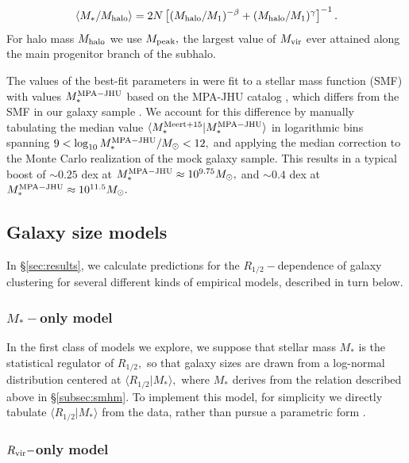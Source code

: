 \documentclass[usenatbib,usegraphicx,letterpaper]{mn2e}
\newcommand{\rhalf}{R_{1/2}}
\newcommand{\mstar}{M_{\ast}}
\newcommand{\mvir}{M_{\rm vir}}
\newcommand{\mpeak}{M_{\rm peak}}
\newcommand{\mhalo}{M_{\rm halo}}
\newcommand{\rvir}{R_{\rm vir}}
\newcommand{\msun}{M_\odot}
\begin{document}
\begin{equation}
\label{eq:smhm}
\langle\mstar/\mhalo\rangle = 2N\left[(\mhalo/M_{1})^{-\beta} + (\mhalo/M_1)^{\gamma}\right]^{-1}.
\end{equation}
For halo mass $\mhalo$ we use $\mpeak,$ the largest value of $\mvir$ ever attained along the main progenitor branch of the subhalo.

The values of the best-fit parameters in \citet{moster_etal13} were fit to a stellar mass function (SMF) with values $\mstar^{\rm MPA-JHU}$ based on the MPA-JHU catalog \citep{kauffmann_etal03,brinchmann_etal04}, which differs from the SMF in our galaxy sample \citep[see, e.g.,][]{bernardi_etal14}. We account for this difference by manually tabulating the median value $\langle\mstar^{\rm Meert+15}\vert\mstar^{\rm MPA-JHU}\rangle$ in logarithmic bins spanning $9 < \log_{10}\mstar^{\rm MPA-JHU}/\msun < 12,$ and applying the median correction to the Monte Carlo realization of the mock galaxy sample. This results in a typical boost of $\sim0.25$ dex at $\mstar^{\rm MPA-JHU}\approx10^{9.75}\msun,$ and $\sim0.4$ dex at $\mstar^{\rm MPA-JHU}\approx10^{11.5}\msun.$

\subsection{Galaxy size models}
\label{subsec:model}

In \S\ref{sec:results}, we calculate predictions for the $\rhalf-$dependence of galaxy clustering for several different kinds of empirical models, described in turn below.


\subsubsection{$\mstar-$only model}
\label{subsubsec:mstaronlymodel}

In the first class of models we explore, we suppose that stellar mass $\mstar$ is the statistical regulator of $\rhalf,$ so that galaxy sizes are drawn from a log-normal distribution centered at $\langle\rhalf\vert\mstar\rangle,$ where $\mstar$ derives from the \citet{moster_etal13} relation described above in \S\ref{subsec:smhm}. To implement this model, for simplicity we directly tabulate $\langle\rhalf\vert\mstar\rangle$ from the data, rather than pursue a parametric form \citep[see, e.g.,][]{zhang_yang17}.

\subsubsection{$\rvir-$only model}
\label{subsubsec:rvirmodel}
\end{document}
